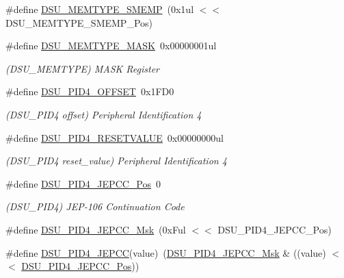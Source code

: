 \begin{DoxyCompactItemize}
\#define \mbox{\hyperlink{group___s_a_m_d21___d_s_u_gaab193425e2e460aea861c9c2ef10fd42}{D\+S\+U\+\_\+\+M\+E\+M\+T\+Y\+P\+E\+\_\+\+S\+M\+E\+MP}}~(0x1ul $<$$<$ D\+S\+U\+\_\+\+M\+E\+M\+T\+Y\+P\+E\+\_\+\+S\+M\+E\+M\+P\+\_\+\+Pos)
\item 
\#define \mbox{\hyperlink{group___s_a_m_d21___d_s_u_ga1452bd6135db23612661a14aba71c287}{D\+S\+U\+\_\+\+M\+E\+M\+T\+Y\+P\+E\+\_\+\+M\+A\+SK}}~0x00000001ul
\begin{DoxyCompactList}\small\item\em (D\+S\+U\+\_\+\+M\+E\+M\+T\+Y\+PE) M\+A\+SK Register \end{DoxyCompactList}\item 
\#define \mbox{\hyperlink{group___s_a_m_d21___d_s_u_ga9b2486d7ffbc473daa210a53c58ae205}{D\+S\+U\+\_\+\+P\+I\+D4\+\_\+\+O\+F\+F\+S\+ET}}~0x1\+F\+D0
\begin{DoxyCompactList}\small\item\em (D\+S\+U\+\_\+\+P\+I\+D4 offset) Peripheral Identification 4 \end{DoxyCompactList}\item 
\#define \mbox{\hyperlink{group___s_a_m_d21___d_s_u_gabff45dc09472f6ef982d193afd7841cc}{D\+S\+U\+\_\+\+P\+I\+D4\+\_\+\+R\+E\+S\+E\+T\+V\+A\+L\+UE}}~0x00000000ul
\begin{DoxyCompactList}\small\item\em (D\+S\+U\+\_\+\+P\+I\+D4 reset\+\_\+value) Peripheral Identification 4 \end{DoxyCompactList}\item 
\#define \mbox{\hyperlink{group___s_a_m_d21___d_s_u_ga09592aca2e0907f95a7a1b7898f77734}{D\+S\+U\+\_\+\+P\+I\+D4\+\_\+\+J\+E\+P\+C\+C\+\_\+\+Pos}}~0
\begin{DoxyCompactList}\small\item\em (D\+S\+U\+\_\+\+P\+I\+D4) J\+E\+P-\/106 Continuation Code \end{DoxyCompactList}\item 
\#define \mbox{\hyperlink{group___s_a_m_d21___d_s_u_ga2a82152e8d4b608bac249b7a20648725}{D\+S\+U\+\_\+\+P\+I\+D4\+\_\+\+J\+E\+P\+C\+C\+\_\+\+Msk}}~(0x\+Ful $<$$<$ D\+S\+U\+\_\+\+P\+I\+D4\+\_\+\+J\+E\+P\+C\+C\+\_\+\+Pos)
\item 
\#define \mbox{\hyperlink{group___s_a_m_d21___d_s_u_ga5fd67c05238d1180cab16bd3363d12e3}{D\+S\+U\+\_\+\+P\+I\+D4\+\_\+\+J\+E\+P\+CC}}(value)~(\mbox{\hyperlink{group___s_a_m_d21___d_s_u_ga2a82152e8d4b608bac249b7a20648725}{D\+S\+U\+\_\+\+P\+I\+D4\+\_\+\+J\+E\+P\+C\+C\+\_\+\+Msk}} \& ((value) $<$$<$ \mbox{\hyperlink{group___s_a_m_d21___d_s_u_ga09592aca2e0907f95a7a1b7898f77734}{D\+S\+U\+\_\+\+P\+I\+D4\+\_\+\+J\+E\+P\+C\+C\+\_\+\+Pos}}))
$$
\end{DoxyCompactItemize}
